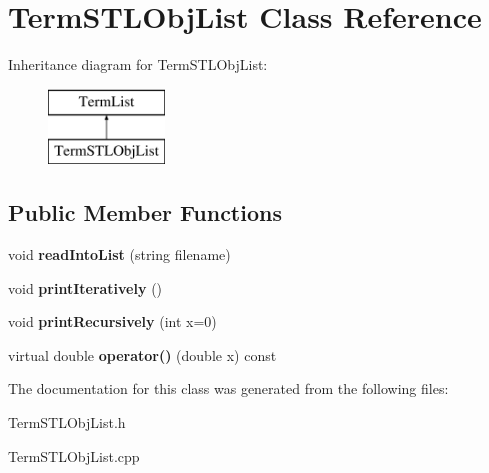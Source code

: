 \hypertarget{classTermSTLObjList}{\section{Term\-S\-T\-L\-Obj\-List Class Reference}
\label{classTermSTLObjList}
}
Inheritance diagram for Term\-S\-T\-L\-Obj\-List\-:\begin{figure}[H]
\begin{center}
\leavevmode
\includegraphics[height=2.000000cm]{classTermSTLObjList}
\end{center}
\end{figure}
\subsection*{Public Member Functions}
\begin{DoxyCompactItemize}
\item 
\hypertarget{classTermSTLObjList_a9797dc26c48d6473785d1de55b9d173f}{void {\bfseries read\-Into\-List} (string filename)}\label{classTermSTLObjList_a9797dc26c48d6473785d1de55b9d173f}

\item 
\hypertarget{classTermSTLObjList_a4580b1ad931cb02e96485659be3e42e8}{void {\bfseries print\-Iteratively} ()}\label{classTermSTLObjList_a4580b1ad931cb02e96485659be3e42e8}

\item 
\hypertarget{classTermSTLObjList_a64b1053185cb942c6c1fa208245d1cbb}{void {\bfseries print\-Recursively} (int x=0)}\label{classTermSTLObjList_a64b1053185cb942c6c1fa208245d1cbb}

\item 
\hypertarget{classTermSTLObjList_a72df52251f91b4ae3227af24296f0f05}{virtual double {\bfseries operator()} (double x) const }\label{classTermSTLObjList_a72df52251f91b4ae3227af24296f0f05}

\end{DoxyCompactItemize}


The documentation for this class was generated from the following files\-:\begin{DoxyCompactItemize}
\item 
Term\-S\-T\-L\-Obj\-List.\-h\item 
Term\-S\-T\-L\-Obj\-List.\-cpp\end{DoxyCompactItemize}
